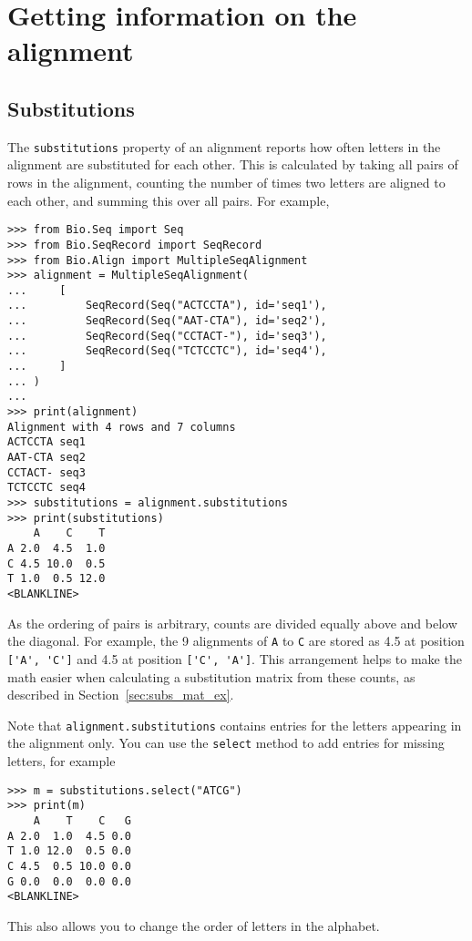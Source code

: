 \section{Getting information on the alignment}

\subsection{Substitutions}

The \verb+substitutions+ property of an alignment reports how often letters in the alignment are substituted for each other. This is calculated by taking all pairs of rows in the alignment, counting the number of times two letters are aligned to each other, and summing this over all pairs. For example,

\begin{verbatim}
>>> from Bio.Seq import Seq
>>> from Bio.SeqRecord import SeqRecord
>>> from Bio.Align import MultipleSeqAlignment
>>> alignment = MultipleSeqAlignment(
...     [
...         SeqRecord(Seq("ACTCCTA"), id='seq1'),
...         SeqRecord(Seq("AAT-CTA"), id='seq2'),
...         SeqRecord(Seq("CCTACT-"), id='seq3'),
...         SeqRecord(Seq("TCTCCTC"), id='seq4'),
...     ]
... )
...
>>> print(alignment)
Alignment with 4 rows and 7 columns
ACTCCTA seq1
AAT-CTA seq2
CCTACT- seq3
TCTCCTC seq4
>>> substitutions = alignment.substitutions
>>> print(substitutions)
    A    C    T
A 2.0  4.5  1.0
C 4.5 10.0  0.5
T 1.0  0.5 12.0
<BLANKLINE>
\end{verbatim}
As the ordering of pairs is arbitrary, counts are divided equally above and below the diagonal. For example, the 9 alignments of \verb+A+ to \verb+C+ are stored as 4.5 at position \verb+['A', 'C']+ and 4.5  at position \verb+['C', 'A']+. This arrangement helps to make the math easier when calculating a substitution matrix from these counts, as described in Section~\ref{sec:subs_mat_ex}.

Note that \verb+alignment.substitutions+ contains entries for the letters appearing in the alignment only. You can use the \verb+select+ method to add entries for missing letters, for example
\begin{verbatim}
>>> m = substitutions.select("ATCG")
>>> print(m)
    A    T    C   G
A 2.0  1.0  4.5 0.0
T 1.0 12.0  0.5 0.0
C 4.5  0.5 10.0 0.0
G 0.0  0.0  0.0 0.0
<BLANKLINE>
\end{verbatim}
This also allows you to change the order of letters in the alphabet.

